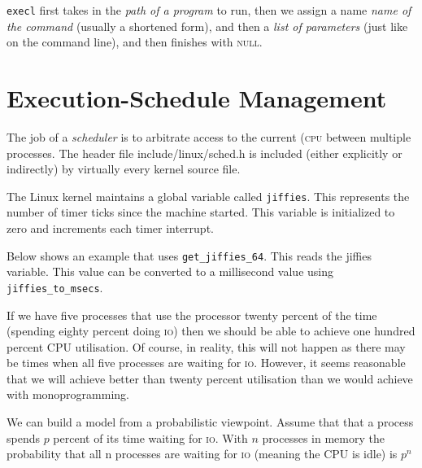 \lstinline{execl} first takes in the \textit{path of a program} to run,
then we assign a name \textit{name of the command} (usually a shortened form), 
and then a  \textit{list of parameters} (just like on 
the command line), and then finishes with \textsc{null}.







\section{Execution-Schedule Management}

The job of a \textit{scheduler} is to arbitrate access to the 
current (\textsc{cpu} between multiple processes.
The header file include/linux/sched.h is included (either explicitly or indirectly) by
virtually every kernel source file.

The Linux kernel maintains a global variable called \lstinline{jiffies}. 
This represents the number of timer ticks since the machine started. 
This variable is initialized to zero and increments each timer interrupt.

Below shows an example that uses \lstinline{get_jiffies_64}. This reads the jiffies 
variable. This value can be converted to a millisecond value using 
\lstinline{jiffies_to_msecs}.



\frmrule

If we have five processes that use the processor twenty percent of the time (spending eighty percent 
doing \textsc{io}) then we should be able to achieve one hundred percent CPU utilisation. Of course, in 
reality, this will not happen as there may be times when all five processes are waiting for \textsc{io}. 
However, it seems reasonable that we will achieve better than twenty percent utilisation than we 
would achieve with monoprogramming. 
 
We can build a model from a probabilistic viewpoint. Assume that that a process spends 
$p$ percent of its time waiting for \textsc{io}. With $n$ processes in memory 
the probability that all n processes are waiting for \textsc{io} (meaning the CPU is idle) is $p^n$





